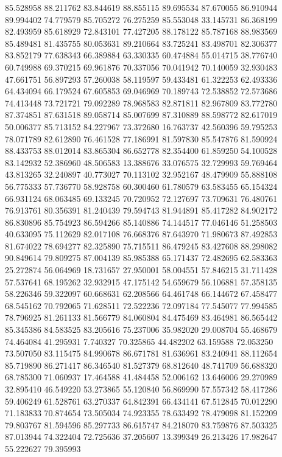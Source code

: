 85.528958
88.211762
83.844619
88.855115
89.695534
87.670055
86.910944
89.994402
74.779579
85.705272
76.275259
85.553048
33.145731
86.368199
82.493959
85.618929
72.843101
77.427205
88.178122
85.787168
88.983569
85.489481
81.435755
80.053631
89.210664
83.725241
83.498701
82.306377
83.852179
77.638343
66.389884
63.330335
60.474884
55.014715
38.776740
60.749988
69.370215
69.961876
70.337056
70.041942
70.140059
32.930483
47.661751
56.897293
57.260038
58.119597
59.433481
61.322253
62.493336
64.434094
66.179524
67.605853
69.046969
70.189743
72.538852
72.573686
74.413448
73.721721
79.092289
78.968583
82.871811
82.967809
83.772780
87.374851
87.631518
89.058714
85.007699
87.310889
88.598772
82.617019
50.006377
85.713152
84.227967
73.372680
16.763737
42.560396
59.795253
78.071789
82.612890
76.461528
77.186991
81.597830
85.547876
81.590924
88.433753
88.012014
83.865304
86.652778
82.354400
61.859250
54.100528
83.142932
52.386960
48.506583
13.388676
33.076575
32.729993
59.769464
43.813265
32.240897
40.773027
70.113102
32.952167
48.479909
55.888108
56.775333
57.736770
58.928758
60.300460
61.780579
63.583455
65.154324
66.931124
68.063485
69.133245
70.720952
72.127697
73.709631
76.480761
76.913761
80.356391
81.240439
79.594743
81.944891
85.417282
84.902172
86.830896
85.754923
86.594266
85.140886
74.144517
77.046146
51.258503
40.633095
75.112629
82.017108
76.668376
87.643970
71.980673
87.492853
81.674022
78.694277
82.325890
75.715511
86.479245
83.427608
88.298082
90.849614
79.809275
87.004139
85.985388
65.171437
72.482695
62.583363
25.272874
56.064969
18.731657
27.950001
58.004551
57.846215
31.711428
57.537641
68.195262
32.932915
47.175142
54.659679
56.106881
57.358135
58.226346
59.322097
60.668631
62.208566
64.461748
66.144672
67.458477
68.545162
70.792065
71.628511
72.522236
72.097184
77.545077
77.994585
78.796925
81.261133
81.566779
84.060804
84.475469
83.464981
86.565442
85.345386
84.583525
83.205616
75.237006
35.982020
29.008704
55.468679
74.464084
41.295931
7.740327
70.325865
44.482202
63.159588
72.053250
73.507050
83.115475
84.990678
86.671781
81.636961
83.240941
88.112654
85.719890
86.271417
86.346540
81.527379
68.812640
48.741709
56.688320
68.785300
71.060937
17.464588
41.484458
52.006162
13.646006
29.270989
32.895410
46.549220
53.273865
55.120840
56.869990
57.557342
58.417286
59.406249
61.528761
63.270337
64.842391
66.434141
67.512845
70.012290
71.183833
70.874654
73.505034
74.923355
78.633492
78.479098
81.152209
79.803767
81.594596
85.297733
86.615747
84.218070
83.759876
87.503325
87.013944
74.322404
72.725636
37.205607
13.399349
26.213426
17.982647
55.222627
79.395993
